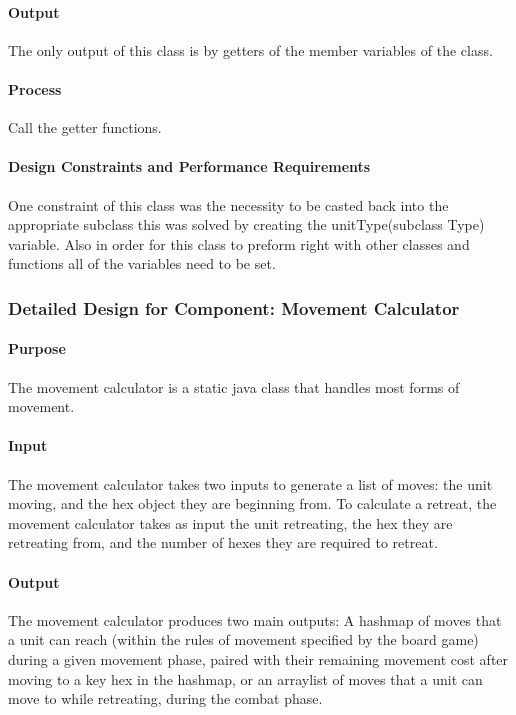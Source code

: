 \documentclass[12pt,a4paper,titlepage]{article}
\begin{document}
\paragraph{Output} The only output of this class is by getters of the member variables of the class. 
\paragraph{Process} Call the getter functions.
\paragraph{Design Constraints and Performance Requirements} One constraint of this class was the necessity to be casted back into the appropriate subclass this was solved by creating the unitType(subclass Type) variable. Also in order for this class to preform right with other classes and functions all of the variables need to be set. 

\subsubsection{Detailed Design for Component: Movement Calculator}
\paragraph{Purpose} The movement calculator is a static java class that handles most forms of movement. 
\paragraph{Input} The movement calculator takes two inputs to generate a list of moves: the unit moving, and the hex object they are beginning from. To calculate a retreat, the movement calculator takes as input the unit retreating, the hex they are retreating from, and the number of hexes they are required to retreat.
\paragraph{Output} The movement calculator produces two main outputs: A hashmap of moves that a unit can reach (within the rules of movement specified by the board game) during a given movement phase, paired with their remaining movement cost after moving to a key hex in the hashmap, or an arraylist of moves that a unit can move to while retreating, during the combat phase.
\end{document}
